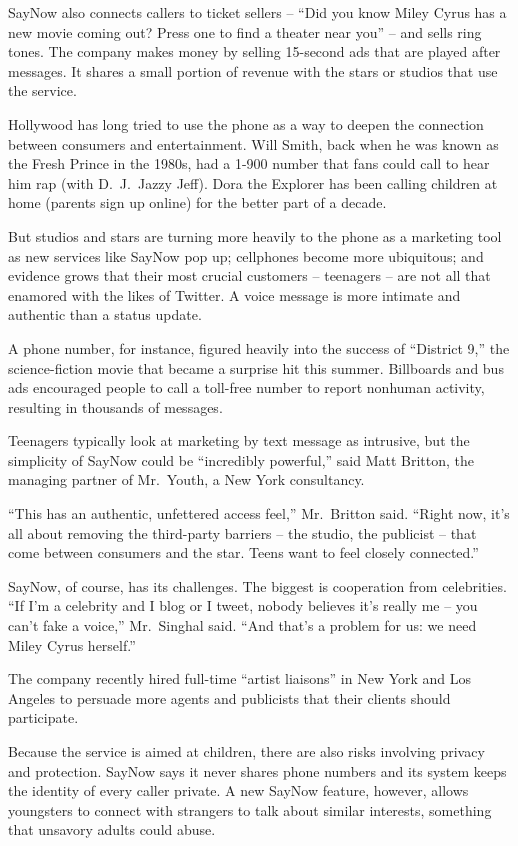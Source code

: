 ﻿\documentclass[12pt]{article}
\begin{document}
SayNow also connects callers to ticket sellers -- ``Did you know Miley Cyrus has a new movie coming
out? Press one to find a theater near you'' -- and sells ring tones. The company makes money by
selling 15-second ads that are played after messages. It shares a small portion of revenue with the
stars or studios that use the service.

Hollywood has long tried to use the phone as a way to deepen the connection between consumers and
entertainment. Will Smith, back when he was known as the Fresh Prince in the 1980s, had a 1-900
number that fans could call to hear him rap (with D.~J.~Jazzy Jeff). Dora the Explorer has been
calling children at home (parents sign up online) for the better part of a decade.

But studios and stars are turning more heavily to the phone as a marketing tool as new services like
SayNow pop up; cellphones become more ubiquitous; and evidence grows that their most crucial
customers -- teenagers -- are not all that enamored\cite{enamor} with the likes of Twitter. A voice
message is more intimate and authentic than a status update.

A phone number, for instance, figured heavily into the success of ``District 9,'' the
science-fiction movie that became a surprise hit this summer. Billboards and bus ads encouraged
people to call a toll-free number to report nonhuman activity, resulting in thousands of messages.

Teenagers typically look at marketing by text message as intrusive, but the simplicity of SayNow
could be ``incredibly powerful,'' said Matt Britton, the managing partner of Mr.~Youth, a New York
consultancy.

``This has an authentic, unfettered access feel,'' Mr.~Britton said. ``Right now, it's all about
removing the third-party barriers -- the studio, the publicist -- that come between consumers and
the star. Teens want to feel closely connected.''

SayNow, of course, has its challenges. The biggest is cooperation from celebrities. ``If I'm a
celebrity and I blog or I tweet, nobody believes it's really me -- you can't fake a voice,''
Mr.~Singhal said. ``And that's a problem for us: we need Miley Cyrus herself.''

The company recently hired full-time ``artist liaisons'' in New York and Los Angeles to persuade
more agents and publicists that their clients should participate.

Because the service is aimed at children, there are also risks involving privacy and protection.
SayNow says it never shares phone numbers and its system keeps the identity of every caller private.
A new SayNow feature, however, allows youngsters to connect with strangers to talk about similar
interests, something that unsavory adults could abuse.
\end{document}
